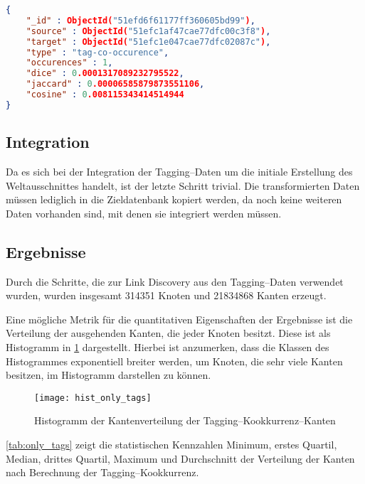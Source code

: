 \begin{lstlisting}[language=json, label={lst:tag_transform_edge}, caption={JSON--Beispiel für eine aus den Tagging--Daten erzeugte Kante}, float]
{
    "_id" : ObjectId("51efd6f61177ff360605bd99"),
    "source" : ObjectId("51efc1af47cae77dfc00c3f8"),
    "target" : ObjectId("51efc1e047cae77dfc02087c"),
    "type" : "tag-co-occurence",
    "occurences" : 1,
    "dice" : 0.0001317089232795522,
    "jaccard" : 0.00006585879873551106,
    "cosine" : 0.008115343414514944
}
\end{lstlisting}

\subsection{Integration}

Da es sich bei der Integration der Tagging--Daten um die initiale Erstellung des Weltausschnittes handelt, ist der letzte Schritt trivial. Die transformierten Daten müssen lediglich in die Zieldatenbank kopiert werden, da noch keine weiteren Daten vorhanden sind, mit denen sie integriert werden müssen.

\subsection{Ergebnisse}

Durch die Schritte, die zur Link Discovery aus den Tagging--Daten verwendet wurden, wurden insgesamt \num{314351} Knoten und \num{21834868} Kanten erzeugt.

Eine mögliche Metrik für die quantitativen Eigenschaften der Ergebnisse ist die Verteilung der ausgehenden Kanten, die jeder Knoten besitzt. Diese ist als Histogramm in \cref{fig:hist_only_tags} dargestellt. Hierbei ist anzumerken, dass die Klassen des Histogrammes exponentiell breiter werden, um Knoten, die sehr viele Kanten besitzen, im Histogramm darstellen zu können.

\begin{figure}[ht]
\centering
\texttt{[image: hist\_only\_tags]}
\caption{Histogramm der Kantenverteilung der Tagging--Kookkurrenz--Kanten}
\label{fig:hist_only_tags}
\end{figure}

\cref{tab:only_tags} zeigt die statistischen Kennzahlen Minimum, erstes Quartil, Median, drittes Quartil, Maximum und Durchschnitt der Verteilung der Kanten nach Berechnung der Tagging--Kookkurrenz.

